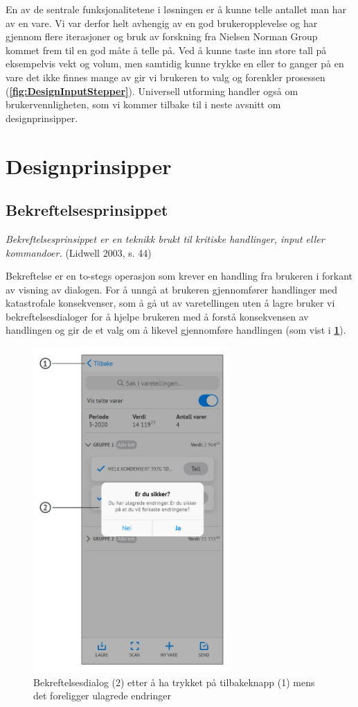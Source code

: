 En av de sentrale funksjonalitetene i løsningen er å kunne telle antallet man har av en vare. Vi var derfor helt avhengig av en god brukeropplevelse og har gjennom flere iterasjoner og bruk av forskning fra Nielsen Norman Group\cite{nngsteppers} kommet frem til en god måte å telle på. Ved å kunne taste inn store tall på eksempelvis vekt og volum, men samtidig kunne trykke en eller to ganger på en vare det ikke finnes mange av gir vi brukeren to valg og forenkler prosessen (\textbf{\ref{fig:DesignInputStepper}}). Universell utforming handler også om brukervennligheten, som vi kommer tilbake til i neste avsnitt om designprinsipper.

\section{\textbf{Designprinsipper}}
\subsection{\textbf{Bekreftelsesprinsippet}}
\textit{Bekreftelsesprinsippet er en teknikk brukt til kritiske handlinger, input eller kommandoer.}  (Lidwell 2003, s. 44)

Bekreftelse er en to-stegs operasjon som krever en handling fra brukeren i forkant av visning av dialogen. For å unngå at brukeren gjennomfører handlinger med katastrofale konsekvenser, som å gå ut av varetellingen uten å lagre bruker vi bekreftelsesdialoger for å hjelpe brukeren med å forstå konsekvensen av handlingen og gir de et valg om å likevel gjennomføre handlingen (som vist i \textbf{\ref{Bekreftelsesdialog}}).

\begin{figure}[H] 
    \centering
    \includegraphics[width=75mm]{figures/Design-utforming/principle_confirmation.JPG}
    \caption{Bekreftelsesdialog (2) etter å ha trykket på tilbakeknapp (1) mens det foreligger ulagrede endringer}
    \label{Bekreftelsesdialog}
\end{figure}

